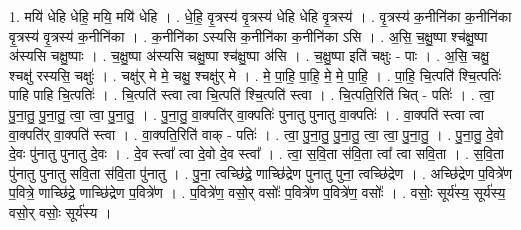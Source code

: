 \documentclass[17pt]{extarticle}
\begin{document}
1. मयि॑ धेहि धेहि॒ मयि॒ मयि॑ धेहि । . धे॒हि॒ वृ॒त्रस्य॑ वृ॒त्रस्य॑ धेहि धेहि वृ॒त्रस्य॑ । . वृ॒त्रस्य॑ क॒नीनि॑का क॒नीनि॑का वृ॒त्रस्य॑ वृ॒त्रस्य॑ क॒नीनि॑का । . क॒नीनि॑का ऽस्यसि क॒नीनि॑का क॒नीनि॑का ऽसि । . अ॒सि॒ च॒क्षु॒ष्पा श्च॑क्षु॒ष्पा अ॑स्यसि चक्षु॒ष्पाः । . च॒क्षु॒ष्पा अ॑स्यसि चक्षु॒ष्पा श्च॑क्षु॒ष्पा अ॑सि । . च॒क्षु॒ष्पा इति॑ चक्षुः - पाः । . अ॒सि॒ चक्षु॒ श्चक्षु॑ रस्यसि॒ चक्षुः॑ । . चक्षु॑र् मे मे॒ चक्षु॒ श्चक्षु॑र् मे । . मे॒ पा॒हि॒ पा॒हि॒ मे॒ मे॒ पा॒हि॒ । . पा॒हि॒ चि॒त्पति॑ श्चि॒त्पतिः॑ पाहि पाहि चि॒त्पतिः॑ । . चि॒त्पति॑ स्त्वा त्वा चि॒त्पति॑ श्चि॒त्पति॑ स्त्वा । . चि॒त्पति॒रिति॑ चित् - पतिः॑ । . त्वा॒ पु॒ना॒तु॒ पु॒ना॒तु॒ त्वा॒ त्वा॒ पु॒ना॒तु॒ । . पु॒ना॒तु॒ वा॒क्पति॑र् वा॒क्पतिः॑ पुनातु पुनातु वा॒क्पतिः॑ । . वा॒क्पति॑ स्त्वा त्वा वा॒क्पति॑र् वा॒क्पति॑ स्त्वा । . वा॒क्पति॒रिति॑ वाक् - पतिः॑ । . त्वा॒ पु॒ना॒तु॒ पु॒ना॒तु॒ त्वा॒ त्वा॒ पु॒ना॒तु॒ । . पु॒ना॒तु॒ दे॒वो दे॒वः पु॑नातु पुनातु दे॒वः । . दे॒व स्त्वा᳚ त्वा दे॒वो दे॒व स्त्वा᳚ । . त्वा॒ स॒वि॒ता स॑वि॒ता त्वा᳚ त्वा सवि॒ता । . स॒वि॒ता पु॑नातु पुनातु सवि॒ता स॑वि॒ता पु॑नातु । . पु॒ना॒ त्वच्छि॑द्रे॒ णाच्छि॑द्रेण पुनातु पुना॒ त्वच्छि॑द्रेण । . अच्छि॑द्रेण प॒वित्रे॑ण प॒वित्रे॒ णाच्छि॑द्रे॒ णाच्छि॑द्रेण प॒वित्रे॑ण । . प॒वित्रे॑ण॒ वसो॒र् वसोः᳚ प॒वित्रे॑ण प॒वित्रे॑ण॒ वसोः᳚ । . वसोः॒ सूर्य॑स्य॒ सूर्य॑स्य॒ वसो॒र् वसोः॒ सूर्य॑स्य । \newline
\end{document}
